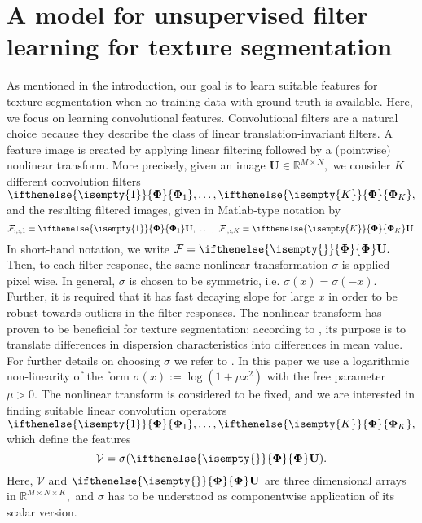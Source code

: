 \documentclass[journal]{IEEEtran}
\newcommand{\Matrix}[1]{\mathbf{#1}}
\newcommand{\Tensor}[1]{\mathcal{#1}}
\newcommand{\AOF}[1]{\ifthenelse{\isempty{#1}}{\boldsymbol{\Phi}}{\boldsymbol{\Phi}_{#1}}}
\newcommand{\SCI}{\Matrix{U}}
\newcommand{\FRT}{\Tensor{F}}
\begin{document}
 

\section{A model for unsupervised filter learning for texture segmentation}
As mentioned in the introduction,
our goal is 
to learn suitable features for texture segmentation when no 
 training data with ground truth is available.
Here, we focus on learning convolutional features.
Convolutional filters are a natural choice because they describe the class of linear translation-invariant filters.
A feature image is created by
applying linear filtering  
followed by a (pointwise) nonlinear transform. 
More precisely,
given an image $\SCI \in \mathbb{R}^{M\times N},$
we consider $K$ different convolution filters $\AOF{1}, \ldots, \AOF{K},$ and the resulting filtered images, given in Matlab-type notation by
\[
    \FRT_{:,:,1} = \AOF{1} \SCI,~\ldots,~
    \FRT_{:,:,K} = \AOF{K} \SCI.
\]
In short-hand notation, we write  $\FRT = \AOF{} \SCI.$
Then, to each filter response, the same nonlinear transformation $\sigma$
is applied pixel wise. In general, $\sigma$ is chosen to be symmetric, i.e. $\sigma(x)=\sigma(-x).$
Further, it is required that it has fast decaying slope for large $x$ 
in order to be robust towards outliers in the filter responses. 
The nonlinear transform has proven to be beneficial for texture segmentation:
according to \cite{unser1990nonlinear},
its purpose is to translate differences in dispersion characteristics into differences in mean value.
For further details on choosing $\sigma$ we refer to \cite{unser1990nonlinear}.
In this paper we use a logarithmic non-linearity of the form $\sigma(x):=\log(1+\mu x^2)$ with the free parameter $\mu >0.$
The nonlinear transform is considered to be fixed, 
and we are interested in finding suitable linear convolution operators 
 $\AOF{1}, \ldots, \AOF{K},$ which define the features
 \[
 \Tensor{V} = \sigma(\AOF{} \SCI).
 \]
 Here, $\Tensor{V}$ and $\AOF{} \SCI$ are three dimensional arrays in $\mathbb{R}^{M\times N \times K},$
 and $\sigma$ has to be understood as componentwise application of its scalar version.
\end{document}

